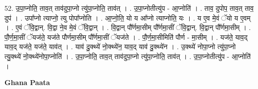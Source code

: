 \documentclass[17pt]{extarticle}
\begin{document}
52. उ॒पा॒प्नोति॒ ताव॒त् ताव॑दुपा॒प्नो त्यु॑पा॒प्नोति॒ ताव॑त् । . उ॒पा॒प्नोतीत्यु॑प - आ॒प्नोति॑ । . ताव॒ दुपोप॒ ताव॒त् ताव॒ दुप॑ । . उपा᳚प्नो त्याप्नो॒ त्यु पोपा᳚प्नोति । . आ॒प्नो॒ति॒ यो य आ᳚प्नो त्याप्नोति॒ यः । . य ए॒व मे॒वं ॅयो य ए॒वम् । . ए॒वं ॅवि॒द्वान्. वि॒द्वा ने॒व मे॒वं ॅवि॒द्वान् । . वि॒द्वान् पौ᳚र्णमा॒सीम् पौ᳚र्णमा॒सीं ॅवि॒द्वान्. वि॒द्वान् पौ᳚र्णमा॒सीम् । . पौ॒र्ण॒मा॒सीं ॅयज॑ते॒ यज॑ते पौर्णमा॒सीम् पौ᳚र्णमा॒सीं ॅयज॑ते । . पौ॒र्ण॒मा॒सीमिति॑ पौर्ण - मा॒सीम् । . यज॑ते॒ याव॒द् याव॒द् यज॑ते॒ यज॑ते॒ याव॑त् । . याव॑ दु॒क्थ्ये॑ नो॒क्थ्ये॑न॒ याव॒द् याव॑ दु॒क्थ्ये॑न । . उ॒क्थ्ये॑ नोपा॒प्नो त्यु॑पा॒प्नो त्यु॒क्थ्ये॑ नो॒क्थ्ये॑नोपा॒प्नोति॑ । . उ॒पा॒प्नोति॒ ताव॒त् ताव॑दुपा॒प्नो त्यु॑पा॒प्नोति॒ ताव॑त् । . उ॒पा॒प्नोतीत्यु॑प - आ॒प्नोति॑ । \newline

\textbf{Ghana Paata } \newline
\end{document}
